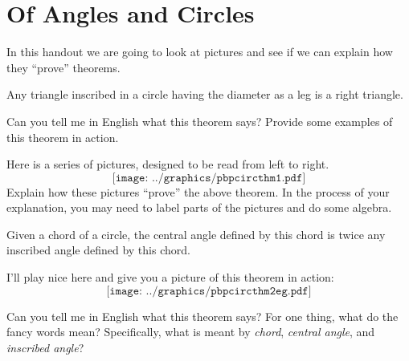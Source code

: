 \newpage
\section{Of Angles and Circles} %

In this handout we are going to look at pictures and see if we can
explain how they ``prove'' theorems.


\begin{theorem} 
Any triangle inscribed in a circle having the diameter as a leg is a
right triangle.
\end{theorem}

\begin{prob}
Can you tell me in English what this theorem says? Provide some
examples of this theorem in action.
\end{prob}

\begin{prob} 
Here is a series of pictures, designed to be read from left to right.
\[
\texttt{[image: ../graphics/pbpcircthm1.pdf]}
\]
Explain how these pictures ``prove'' the above theorem. In the process
of your explanation, you may need to label parts of the pictures and
do some algebra.
\end{prob}


\begin{theorem} 
Given a chord of a circle, the central angle defined by this chord is
twice any inscribed angle defined by this chord.
\end{theorem}

I'll play nice here and give you a picture of this theorem in action:
\[
\texttt{[image: ../graphics/pbpcircthm2eg.pdf]}
\]

\begin{prob}
Can you tell me in English what this theorem says? For one thing, what
do the fancy words mean? Specifically, what is meant by
\textit{chord}, \textit{central angle}, and \textit{inscribed angle}?
\end{prob}

